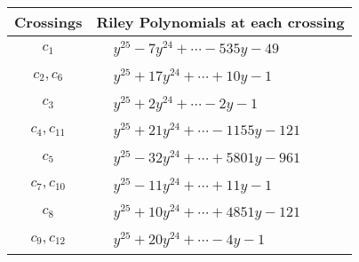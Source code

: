 \documentclass[1p]{elsarticle_modified}
\theoremstyle{definition}
\begin{document}
\begin{tabular}{m{50pt}|m{274pt}}
Crossings & \hspace{64pt}Riley Polynomials at each crossing \\
\hline $$\begin{aligned}c_{1}\end{aligned}$$&$\begin{aligned}
&y^{25}-7 y^{24}+\cdots-535 y-49
\end{aligned}$\\
\hline $$\begin{aligned}c_{2},c_{6}\end{aligned}$$&$\begin{aligned}
&y^{25}+17 y^{24}+\cdots+10 y-1
\end{aligned}$\\
\hline $$\begin{aligned}c_{3}\end{aligned}$$&$\begin{aligned}
&y^{25}+2 y^{24}+\cdots-2 y-1
\end{aligned}$\\
\hline $$\begin{aligned}c_{4},c_{11}\end{aligned}$$&$\begin{aligned}
&y^{25}+21 y^{24}+\cdots-1155 y-121
\end{aligned}$\\
\hline $$\begin{aligned}c_{5}\end{aligned}$$&$\begin{aligned}
&y^{25}-32 y^{24}+\cdots+5801 y-961
\end{aligned}$\\
\hline $$\begin{aligned}c_{7},c_{10}\end{aligned}$$&$\begin{aligned}
&y^{25}-11 y^{24}+\cdots+11 y-1
\end{aligned}$\\
\hline $$\begin{aligned}c_{8}\end{aligned}$$&$\begin{aligned}
&y^{25}+10 y^{24}+\cdots+4851 y-121
\end{aligned}$\\
\hline $$\begin{aligned}c_{9},c_{12}\end{aligned}$$&$\begin{aligned}
&y^{25}+20 y^{24}+\cdots-4 y-1
\end{aligned}$\\
\hline
\end{tabular}\\~\\
\end{document}
